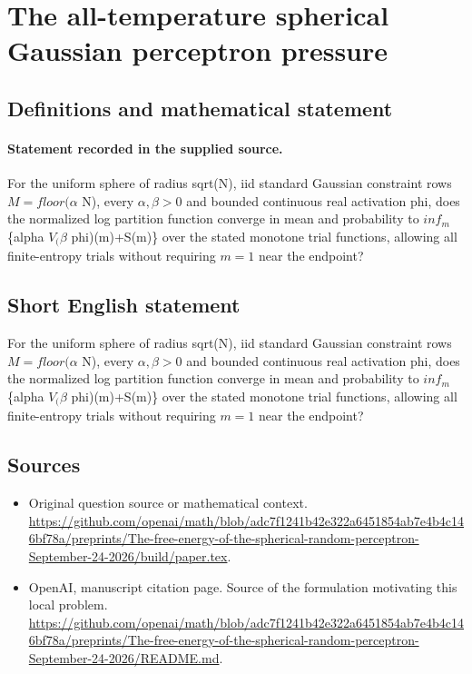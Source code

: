 \documentclass[11pt]{article}
\begin{document}
\section*{The all-temperature spherical Gaussian perceptron pressure}\label{30007364}
\subsection{Definitions and mathematical statement}
\paragraph{Statement recorded in the supplied source.}
For the uniform sphere of radius sqrt(N), iid standard Gaussian constraint rows $M=floor(\alpha $ N), every $\alpha ,\beta >0$ and bounded continuous real activation phi, does the normalized log partition function converge in mean and probability to $inf_m$ \{alpha $V_(\beta $ phi)(m)+S(m)\} over the stated monotone trial functions, allowing all finite-entropy trials without requiring $m=1$ near the endpoint?
\subsection{Short English statement}
For the uniform sphere of radius sqrt(N), iid standard Gaussian constraint rows $M=floor(\alpha $ N), every $\alpha ,\beta >0$ and bounded continuous real activation phi, does the normalized log partition function converge in mean and probability to $inf_m$ \{alpha $V_(\beta $ phi)(m)+S(m)\} over the stated monotone trial functions, allowing all finite-entropy trials without requiring $m=1$ near the endpoint?
\subsection{Sources}
\begin{itemize}
\item[S1] Original question source or mathematical context.
\url{https://github.com/openai/math/blob/adc7f1241b42e322a6451854ab7e4b4c146bf78a/preprints/The-free-energy-of-the-spherical-random-perceptron-September-24-2026/build/paper.tex}.
\item[S2] OpenAI, manuscript citation page. Source of the formulation motivating this local problem.
\url{https://github.com/openai/math/blob/adc7f1241b42e322a6451854ab7e4b4c146bf78a/preprints/The-free-energy-of-the-spherical-random-perceptron-September-24-2026/README.md}.
\end{itemize}
\end{document}

